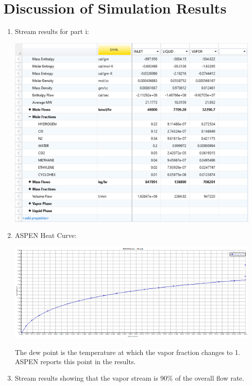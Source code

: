 \documentclass[12pt]{article}
\begin{document}
\section{Discussion of Simulation Results}

\begin{enumerate}
    \item Stream results for part i:

    \includegraphics[scale=0.9]{parti.png}

    \item ASPEN Heat Curve:

    \includegraphics[scale=0.9]{curve.png}

    The dew point is the temperature at which the vapor fraction changes to 1. ASPEN reports this point in the results.

    \item Stream results showing that the vapor stream is 90\% of the overall flow rate.


\end{enumerate}
\end{document}

